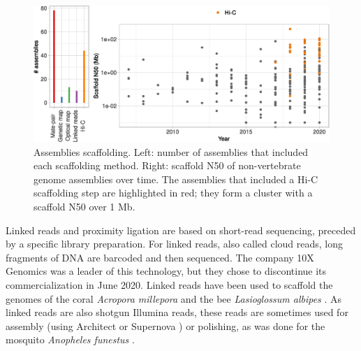 \begin{figure}
    \centering
    \includegraphics[width=\textwidth]{fig/review_scaffolding.eps}
    \caption{Assemblies scaffolding. Left: number of assemblies that included each scaffolding method. Right: scaffold N50 of non-vertebrate genome assemblies over time. The assemblies that included a Hi-C scaffolding step are highlighted in red; they form a cluster with a scaffold N50 over 1 Mb.}
    \label{fig:hic}
\end{figure}

Linked reads and proximity ligation are based on short-read sequencing, preceded by a specific library preparation. For linked reads, also called cloud reads, long fragments of DNA are barcoded and then sequenced. The company 10X Genomics was a leader of this technology, but they chose to discontinue its commercialization in June 2020. Linked reads have been used to scaffold the genomes of the coral \textit{Acropora millepora} \cite{acropora_millepora2} and the bee \textit{Lasioglossum albipes} \cite{lasioglossum_albipes}. As linked reads are also shotgun Illumina reads, these reads are sometimes used for assembly (using Architect \cite{architect} or Supernova \cite{supernova}) or polishing, as was done for the mosquito \textit{Anopheles funestus} \cite{anopheles_funestus}. \\

